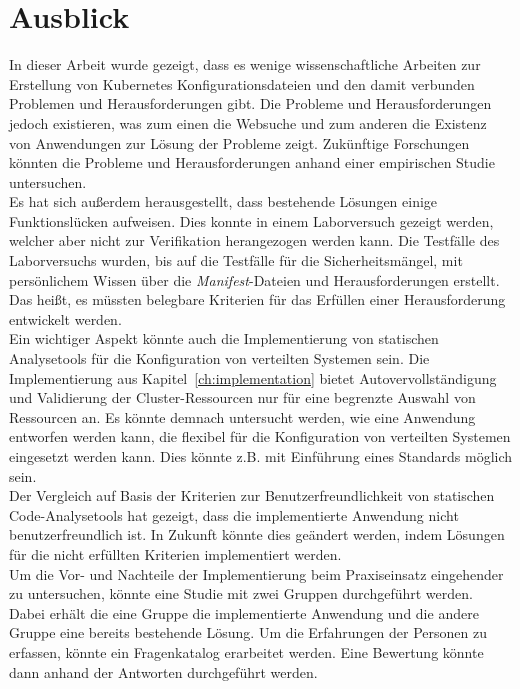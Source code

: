 \section{Ausblick}

In dieser Arbeit wurde gezeigt, dass es wenige wissenschaftliche Arbeiten zur Erstellung von
Kubernetes Konfigurationsdateien und den damit verbunden Problemen und Herausforderungen gibt.
Die Probleme und Herausforderungen jedoch existieren, was zum einen die Websuche und zum anderen die
Existenz von Anwendungen zur Lösung der Probleme zeigt. Zukünftige Forschungen könnten die Probleme und Herausforderungen
anhand einer empirischen Studie untersuchen.
\\
Es hat sich außerdem herausgestellt, dass bestehende Lösungen einige Funktionslücken aufweisen.
Dies konnte in einem Laborversuch gezeigt werden, welcher aber nicht zur Verifikation herangezogen werden kann.
Die Testfälle des Laborversuchs wurden, bis auf die Testfälle für die Sicherheitsmängel,
mit persönlichem Wissen über die \textit{Manifest}-Dateien und Herausforderungen erstellt.
Das heißt, es müssten belegbare Kriterien für das Erfüllen einer Herausforderung entwickelt werden.
\\
Ein wichtiger Aspekt könnte auch die Implementierung von statischen Analysetools für die Konfiguration von
verteilten Systemen sein. Die Implementierung aus Kapitel~\ref{ch:implementation} bietet Autovervollständigung und Validierung
der Cluster-Ressourcen nur für eine begrenzte Auswahl von Ressourcen an. Es könnte demnach untersucht werden,
wie eine Anwendung entworfen werden kann, die flexibel für die Konfiguration von verteilten Systemen eingesetzt werden kann.
Dies könnte z.B. mit Einführung eines Standards möglich sein.
\\
Der Vergleich auf Basis der Kriterien zur Benutzerfreundlichkeit von statischen Code-Analysetools hat gezeigt,
dass die implementierte Anwendung nicht benutzerfreundlich ist.
In Zukunft könnte dies geändert werden, indem Lösungen für die nicht erfüllten Kriterien implementiert werden.
\\
Um die Vor- und Nachteile der Implementierung beim Praxiseinsatz eingehender zu untersuchen, könnte eine Studie mit
zwei Gruppen durchgeführt werden. Dabei erhält die eine Gruppe die implementierte Anwendung und die andere Gruppe
eine bereits bestehende Lösung. Um die Erfahrungen der Personen zu erfassen, könnte ein Fragenkatalog erarbeitet werden.
Eine Bewertung könnte dann anhand der Antworten durchgeführt werden.